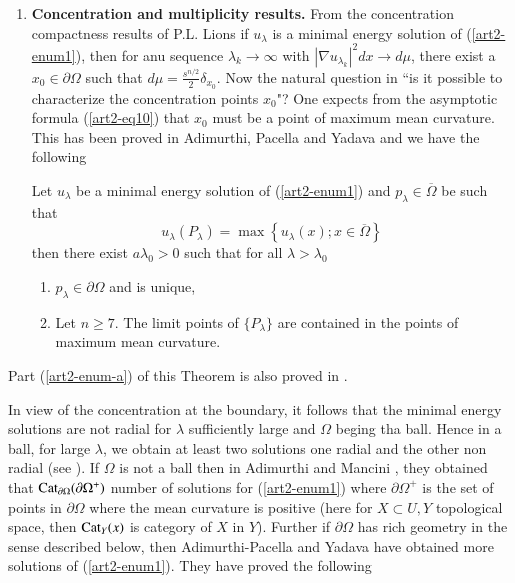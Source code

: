 \begin{enumerate}[{\rm \bf 1.}]
\item \textbf{Concentration and multiplicity results.} From the concentration compactness results of P.L. Lions \cite{art2-key17} if $u_{\lambda}$ is a minimal energy solution of (\ref{art2-enum1}), then for anu sequence $\lambda_{k} \rightarrow \infty$ with $|\nabla u_{\lambda_{k}}|^{2}dx \rightarrow d\mu$, there exist a $x_{0}\in \partial\Omega$ such that $d\mu = \frac{s^{n/2}}{2}\delta_{x_{0}}$. Now the natural question in ``is it possible to characterize the concentration points $x_{0}$"? One expects from the asymptotic formula (\ref{art2-eq10}) that $x_{0}$ must be a point of maximum mean curvature. This has been proved in Adimurthi, Pacella and Yadava \cite{art2-key7} and we have the following

\begin{theorem}\label{art2-thm6}
Let $u_{\lambda}$ be a minimal energy solution of (\ref{art2-enum1}) and $p_{\lambda} \in \overline{\Omega}$ be such that
$$
u_{\lambda}(P_{\lambda}) = \max\left\{u_{\lambda}(x) ; x\in \overline{\Omega}\right\}
$$
then there exist $a \lambda_{0} > 0$ such that for all $\lambda > \lambda_{0}$
\begin{enumerate}[{\rm a)}]
\item $p_{\lambda} \in \partial\Omega$ and is unique,\label{art2-enum-a}
\item Let $n\geq 7$. The limit points of $\{P_{\lambda}\}$ are contained in the points of maximum mean curvature.\label{art2-enum-b)} 
\end{enumerate}
\end{theorem}
\end{enumerate}
Part (\ref{art2-enum-a}) of this Theorem is also proved in \cite{art2-key19}.

In view of the concentration at the boundary, it follows that the minimal energy solutions are not radial for $\lambda$ sufficiently large and $\Omega$ beging tha ball. Hence in a ball, for large $\lambda$, we obtain at  least two solutions one radial and the other non radial (see \cite{art2-key5}). If $\Omega$ is not a ball then in Adimurthi and Mancini \cite{art2-key2}, they obtained that $\operatorname{Cat}_{\partial\Omega}(\partial\Omega^{+})$ number of solutions for (\ref{art2-enum1}) where $\partial\Omega^{+}$ is the set of points in $\partial\Omega$ where the mean curvature is positive (here for $X \subset U, Y$ topological space, then $\operatorname{Cat}_{Y}(x)$ is category of $X$ in $Y$). Further if $\partial\Omega$ has rich geometry in the sense described below, then Adimurthi-Pacella and Yadava \cite{art2-key7} have obtained more solutions of (\ref{art2-enum1}). They have proved the following

